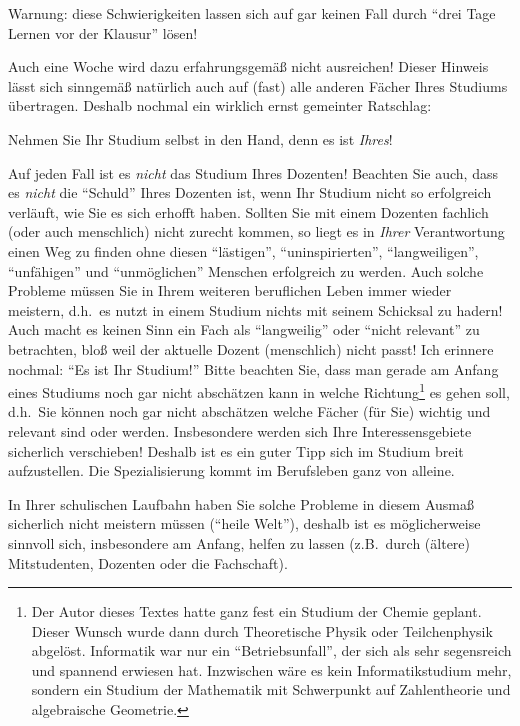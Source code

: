 \begin{center}
\large Warnung:  diese Schwierigkeiten lassen sich auf gar keinen Fall durch 
"`drei Tage Lernen vor der Klausur"' lösen!
\end{center}

Auch eine Woche wird dazu erfahrungsgemäß nicht ausreichen! Dieser
Hinweis lässt sich sinngemäß natürlich auch auf (fast) alle anderen
Fächer Ihres Studiums übertragen. Deshalb nochmal ein wirklich ernst gemeinter 
Ratschlag:
\begin{center}
	\large Nehmen Sie Ihr Studium selbst in den Hand, denn es ist \emph{Ihres}!
\end{center}
Auf jeden Fall ist es \emph{nicht} das Studium Ihres Dozenten! Beachten Sie auch, dass 
es \emph{nicht} die "`Schuld"' Ihres Dozenten ist, wenn Ihr Studium nicht so erfolgreich
verläuft, wie Sie es sich erhofft haben. Sollten Sie mit einem Dozenten fachlich (oder 
auch menschlich) nicht zurecht kommen, so liegt es in \emph{Ihrer} Verantwortung einen Weg zu finden ohne diesen "`lästigen"', "`uninspirierten"', "`langweiligen"', "`unfähigen"' und  "`unmöglichen"' Menschen erfolgreich zu werden. Auch solche 
Probleme müssen Sie in Ihrem weiteren beruflichen Leben immer wieder meistern, 
d.h.~es nutzt in einem Studium nichts mit seinem Schicksal zu hadern! Auch macht es 
keinen Sinn ein  Fach als "`langweilig"' oder "`nicht relevant"' zu betrachten, bloß weil 
der aktuelle  Dozent (menschlich) nicht passt! Ich erinnere nochmal: "`Es ist Ihr 
Studium!"' Bitte beachten Sie, dass man gerade am Anfang eines Studiums noch gar 
nicht abschätzen kann in welche Richtung\footnote{Der Autor dieses Textes hatte ganz 
fest ein Studium der Chemie geplant. Dieser Wunsch wurde dann durch Theoretische 
Physik oder Teilchenphysik abgelöst. Informatik war nur ein "`Betriebsunfall"', der sich 
als sehr segensreich und spannend erwiesen hat. Inzwischen wäre es kein 
Informatikstudium mehr,  sondern ein Studium der Mathematik mit Schwerpunkt auf 
Zahlentheorie und  algebraische Geometrie.} es gehen soll, d.h.~Sie können noch gar 
nicht abschätzen welche Fächer (für Sie) wichtig und relevant sind oder werden. Insbesondere werden sich Ihre Interessensgebiete sicherlich verschieben! Deshalb ist
es ein guter Tipp sich im Studium breit aufzustellen. Die Spezialisierung kommt im 
Berufsleben ganz von alleine.

In Ihrer schulischen Laufbahn haben Sie solche Probleme  in diesem Ausmaß sicherlich 
nicht meistern müssen ("`heile Welt"'),  deshalb ist es möglicherweise sinnvoll 
sich, insbesondere am Anfang, helfen zu lassen (z.B.~durch (ältere) Mitstudenten,  Dozenten 
oder die Fachschaft).

